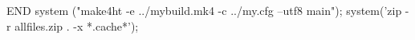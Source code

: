 END { 
  system ("make4ht -e ../mybuild.mk4 -c ../my.cfg --utf8 main"); 
  system('zip -r allfiles.zip . -x *.cache*');
}